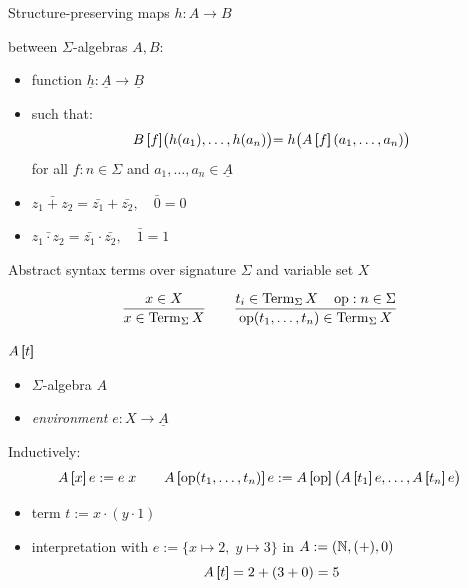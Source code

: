 \documentclass[10pt, english, xcolor={dvipsnames}]{beamer}
\begin{document}
\begin{frame}{Structure-preserving maps}
   $h : A \to B$

  between $\Sigma$-algebras $A, B$:
  \begin{itemize}
    \item function $\underline h : \underline{A} \to \underline{B}$
    \item such that: $$B \brak{f}\bigr(h(a_1), \ldots, h(a_n)\bigl) = h\bigr(A \brak{f}(a_1, \ldots, a_n)\bigl)$$ for all $f : n \in \Sigma$ and $a_1, \dots, a_n \in \underline{A}$
  \end{itemize}

  \vspace{0.5cm}
  \begin{itemize}
    \item $\bar{z_1 + z_2} = \bar{z_1} + \bar{z_2}, \quad \bar{0} = 0$
    \item $\bar{z_1 \cdot z_2} = \bar{z_1} \cdot \bar{z_2}, \quad \bar{1} = 1$
  \end{itemize}
\end{frame}

\begin{frame}{Abstract syntax}
   terms over signature $\Sigma$ and variable set $X$

  $$\dfrac{x \in X}{x \in \operatorname{Term}_\Sigma X} \qquad \dfrac{t_i \in \operatorname{Term}_\Sigma X \quad \operatorname{op} : n \in \Sigma}{\operatorname{op}(t_1, \dots, t_n) \in \operatorname{Term}_\Sigma X}$$

  \vspace{0.3cm}
   $A\left[\!\!\!\:\left[ t \right]\!\!\!\:\right]$
  \begin{itemize}
    \item $\Sigma$-algebra $A$
    \item \emph{environment} $e : X \to \underline A$ 
  \end{itemize}
  Inductively:
  $$A \brak{x} e := e\; x \qquad A \brak{\op(t_1, \dots, t_n)} e := A \brak{\op} \bigl(A \brak{t_1} e, \dots, A \brak{t_n} e\bigr)$$
  \begin{itemize}
    \item term $t := x \cdot (y \cdot 1)$
    \item interpretation  with $e := \{x \mapsto 2,\; y \mapsto 3\}$ in $A := (\mathbb N, (+), 0)$
    $$A\left[\!\!\!\:\left[ t \right]\!\!\!\:\right] = 2 + (3 + 0) = 5$$
  \end{itemize}
\end{frame}
\end{document}
